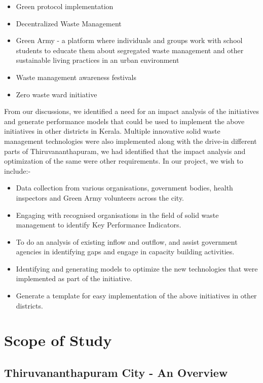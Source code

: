 \documentclass[12pt,a4paper]{report}
\begin{document}
\begin{itemize}
\item Green protocol implementation
\item Decentralized Waste Management
\item Green Army - a platform where individuals and groups work with school students to educate them about  segregated waste management and other sustainable living practices in an urban environment
\item Waste management awareness festivals
\item Zero waste ward initiative
\end{itemize}

From our discussions, we identified a need for an impact analysis of the initiatives and generate performance models that could be used to implement the above initiatives in other districts in Kerala. Multiple innovative solid waste management technologies were also implemented along with the drive-in different parts of Thiruvananthapuram, we had identified that the impact analysis and optimization of the same were other requirements.
In our project, we wish to include:-

\begin{itemize}
\item Data collection from various organisations, government bodies, health inspectors and Green Army volunteers across the city.
\item Engaging with recognised organisations in the field of solid waste management to identify Key Performance Indicators.
\item To do an analysis of existing inflow and outflow, and assist government agencies in identifying gaps and engage in capacity building activities.
\item Identifying and generating models to optimize the new technologies that were implemented as part of the initiative.
\item Generate a template for easy implementation of the above initiatives in other districts.

\end{itemize}

\chapter{\textbf{Scope of Study}}

\section{Thiruvananthapuram City - An Overview}
\end{document}
